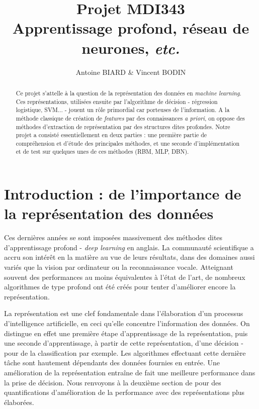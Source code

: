 \documentclass[10pt,a4paper]{article}
\title{Projet MDI343 \\
Apprentissage profond, réseau de neurones, \emph{etc.}}
\author{Antoine BIARD \& Vincent BODIN}
\date{}
\begin{document}
\maketitle

\hrulefill
\vspace{2cm}
\renewcommand{\abstractname}{Résumé}
\begin{abstract}
Ce projet s'attelle à la question de la représentation des données en \emph{machine learning}. Ces représentations, utilisées ensuite par l'algorithme de décision - régression logistique, SVM... - jouent un rôle primordial car porteuses de l'information. A la méthode classique de création de \emph{features} par des connaissances \emph{a priori}, on oppose des méthodes d'extraction de représentation par des structures dites profondes. Notre projet a consisté essentiellement en deux parties : une première partie de compréhension et d'étude des principales méthodes, et une seconde d'implémentation et de test sur quelques unes de ces méthodes (RBM, MLP, DBN).
\end{abstract}

\newpage
\tableofcontents
\newpage

\section{Introduction : de l'importance de la représentation des données}

Ces dernières années se sont imposées massivement des méthodes dites d'apprentissage profond - \emph{deep learning} en anglais. La communauté scientifique a accru son intérêt en la matière au vue de leurs résultats, dans des domaines aussi variés que la vision par ordinateur ou la reconnaissance vocale. Atteignant souvent des performances au moins équivalentes à l'état de l'art, de nombreux algorithmes de type profond ont été créés pour tenter d'améliorer encore la représentation.

La représentation est une clef fondamentale dans l'élaboration d'un processus d'intelligence artificielle, en ceci qu'elle concentre l'information des données. On distingue en effet une première étape d'apprentissage de la représentation, puis une seconde d'apprentissage, à partir de cette représentation, d'une décision - pour de la classification par exemple. Les algorithmes effectuant cette dernière tâche sont hautement dépendants des données fournies en entrée. Une amélioration de la représentation entraîne de fait une meilleure performance dans la prise de décision. Nous renvoyons à la deuxième section de \cite{DBLP:journals/corr/abs-1206-5538} pour des quantifications d'amélioration de la performance avec des représentations plus élaborées.
\end{document}
